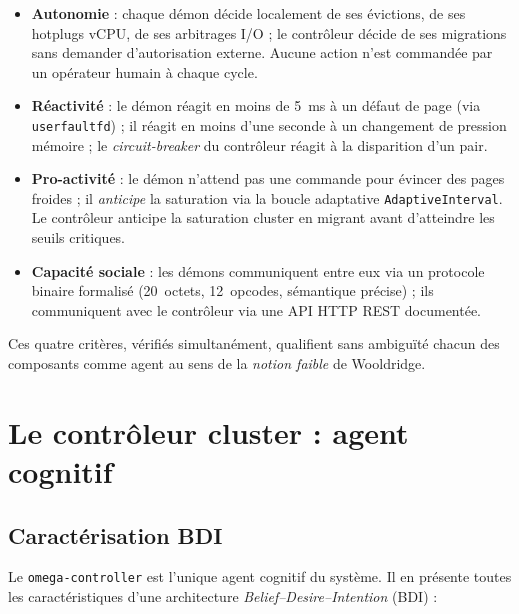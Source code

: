 \begin{itemize}[leftmargin=*]
    \item \textbf{Autonomie} : chaque démon décide localement de ses évictions, de ses hotplugs vCPU, de ses arbitrages I/O ; le contrôleur décide de ses migrations sans demander d'autorisation externe. Aucune action n'est commandée par un opérateur humain à chaque cycle.
    \item \textbf{Réactivité} : le démon réagit en moins de 5~ms à un défaut de page (via \texttt{userfaultfd}) ; il réagit en moins d'une seconde à un changement de pression mémoire ; le \emph{circuit-breaker} du contrôleur réagit à la disparition d'un pair.
    \item \textbf{Pro-activité} : le démon n'attend pas une commande pour évincer des pages froides ; il \emph{anticipe} la saturation via la boucle adaptative \texttt{AdaptiveInterval}. Le contrôleur anticipe la saturation cluster en migrant avant d'atteindre les seuils critiques.
    \item \textbf{Capacité sociale} : les démons communiquent entre eux via un protocole binaire formalisé (20~octets, 12~opcodes, sémantique précise) ; ils communiquent avec le contrôleur via une API HTTP REST documentée.
\end{itemize}

Ces quatre critères, vérifiés simultanément, qualifient sans ambiguïté chacun des composants comme agent au sens de la \emph{notion faible} de Wooldridge.

\section{Le contrôleur cluster : agent cognitif}
\label{sec:sma-controller}

\subsection{Caractérisation BDI}

Le \texttt{omega-controller} est l'unique agent cognitif du système. Il en présente toutes les caractéristiques d'une architecture \emph{Belief--Desire--Intention} (BDI) :

